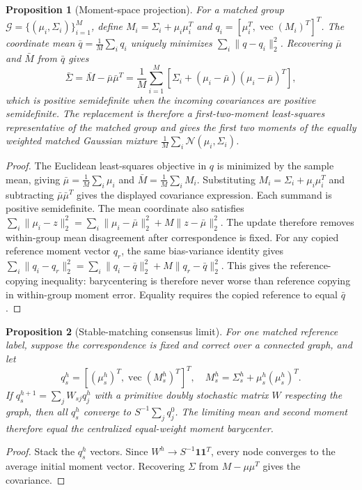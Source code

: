\documentclass{IEEEtaes}
\newtheorem{proposition}{Proposition}
\begin{document}
\begin{proposition}[Moment-space projection]
For a matched group $\mathcal{G}=\{(\mu_i,\Sigma_i)\}_{i=1}^{M}$, define $M_i=\Sigma_i+\mu_i\mu_i^T$ and $q_i=[\mu_i^T,\operatorname{vec}(M_i)^T]^T$. The coordinate mean $\bar{q}=\frac{1}{M}\sum_i q_i$ uniquely minimizes $\sum_i\|q-q_i\|_2^2$. Recovering $\bar{\mu}$ and $\bar{M}$ from $\bar{q}$ gives
\begin{equation}
  \bar{\Sigma}=\bar{M}-\bar{\mu}\bar{\mu}^T
  =\frac{1}{M}\sum_{i=1}^{M}
  \left[\Sigma_i+(\mu_i-\bar{\mu})(\mu_i-\bar{\mu})^T\right],
\end{equation}
which is positive semidefinite when the incoming covariances are positive semidefinite. The replacement is therefore a first-two-moment least-squares representative of the matched group and gives the first two moments of the equally weighted matched Gaussian mixture $\frac{1}{M}\sum_i\mathcal{N}(\mu_i,\Sigma_i)$.
\end{proposition}
\begin{proof}
The Euclidean least-squares objective in $q$ is minimized by the sample mean, giving $\bar{\mu}=\frac{1}{M}\sum_i\mu_i$ and $\bar{M}=\frac{1}{M}\sum_i M_i$. Substituting $M_i=\Sigma_i+\mu_i\mu_i^T$ and subtracting $\bar{\mu}\bar{\mu}^T$ gives the displayed covariance expression. Each summand is positive semidefinite. The mean coordinate also satisfies $\sum_i\|\mu_i-z\|_2^2=\sum_i\|\mu_i-\bar{\mu}\|_2^2+M\|z-\bar{\mu}\|_2^2$. The update therefore removes within-group mean disagreement after correspondence is fixed. For any copied reference moment vector $q_r$, the same bias-variance identity gives $\sum_i\|q_i-q_r\|_2^2=\sum_i\|q_i-\bar{q}\|_2^2+M\|q_r-\bar{q}\|_2^2$. This gives the reference-copying inequality: barycentering is therefore never worse than reference copying in within-group moment error. Equality requires the copied reference to equal $\bar{q}$.
\end{proof}

\begin{proposition}[Stable-matching consensus limit]
For one matched reference label, suppose the correspondence is fixed and correct over a connected graph, and let
\begin{equation}
  q_s^h=\left[(\mu_s^h)^T,\operatorname{vec}(M_s^h)^T\right]^T,
  \quad M_s^h=\Sigma_s^h+\mu_s^h(\mu_s^h)^T .
\end{equation}
If $q_s^{h+1}=\sum_j W_{sj}q_j^h$ with a primitive doubly stochastic matrix $W$ respecting the graph, then all $q_s^h$ converge to $S^{-1}\sum_j q_j^0$. The limiting mean and second moment therefore equal the centralized equal-weight moment barycenter.
\end{proposition}
\begin{proof}
Stack the $q_s^h$ vectors. Since $W^h\rightarrow S^{-1}\mathbf{1}\mathbf{1}^T$, every node converges to the average initial moment vector. Recovering $\Sigma$ from $M-\mu\mu^T$ gives the covariance.
\end{proof}
\end{document}
